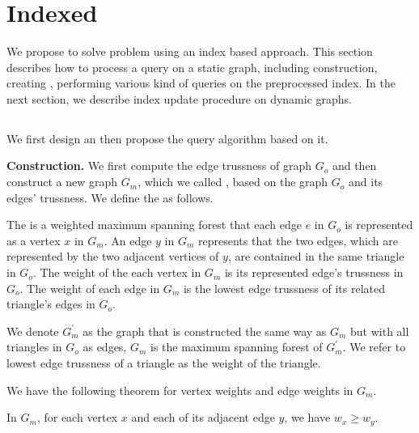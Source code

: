 \section{Indexed \ProbDef}
\label{index}

We propose to solve \probdef{} problem using an index based approach. This section describes how to process a \probdef{} query on a static graph, including \inducedgraph{} construction, creating \treeindex{}, performing various kind of queries on the preprocessed index. In the next section, we describe index update procedure on dynamic graphs.

\subsection{\InducedGraph{}}

We first design an \inducedgraph{} then propose the query algorithm based on it.

\vskip 0.1in \noindent \textbf{\InducedGraph{} Construction.} We first compute the edge trussness of graph $G_o$ and then construct a new graph $G_m$, which we called \inducedgraph{}, based on the graph $G_o$ and its edges' trussness. We define the \inducedgraph{} as follows.

\begin{Def}[\inducedgraph{}]
The \inducedgraph{} is a weighted maximum spanning forest that each edge $e$ in $G_o$ is represented as a vertex $x$ in $G_m$. An edge $y$ in $G_m$ represents that the two edges, which are represented by the two adjacent vertices of $y$, are contained in the same triangle in $G_o$. The weight of the each vertex in $G_m$ is its represented edge's trussness in $G_o$. The weight of each edge in $G_m$ is the lowest edge trussness of its related triangle's edges in $G_o$.
\label{def:\inducedgraph{}}
\end{Def}

We denote $G_{m}^{\prime}$ as the graph that is constructed the same way as $G_m$ but with all triangles in $G_o$ as edges, \ie $G_m$ is the maximum spanning forest of $G_{m}^{\prime}$. We refer to lowest edge trussness of a triangle as the weight of the triangle. 

We have the following theorem for vertex weights and edge weights in \inducedgraph{} $G_m$.

\begin{Thm}
In \inducedgraph{} $G_m$, for each vertex $x$ and each of its adjacent edge $y$, we have $w_x \ge w_y$.
\label{thm:\inducedgraph{}_vertex_trussness}
\end{Thm}

